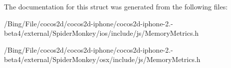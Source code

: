 The documentation for this struct was generated from the following files\-:\begin{DoxyCompactItemize}
\item 
/\-Bing/\-File/cocos2d/cocos2d-\/iphone/cocos2d-\/iphone-\/2.-\/beta4/external/\-Spider\-Monkey/ios/include/js/Memory\-Metrics.\-h\item 
/\-Bing/\-File/cocos2d/cocos2d-\/iphone/cocos2d-\/iphone-\/2.-\/beta4/external/\-Spider\-Monkey/osx/include/js/Memory\-Metrics.\-h\end{DoxyCompactItemize}
